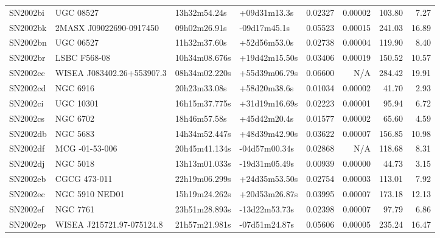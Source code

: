 \begin{longtable}{llllrrrr}
SN2002bi         &                       UGC 08527 &    13h32m54.24s &    +09d31m13.3s &  0.02327 &  0.00002 &   103.80 &        7.27 \\
SN2002bk         &         2MASX J09022690-0917450 &    09h02m26.91s &    -09d17m45.1s &  0.05523 &  0.00015 &   241.03 &       16.89 \\
SN2002bn         &                       UGC 06527 &    11h32m37.60s &    +52d56m53.0s &  0.02738 &  0.00004 &   119.90 &        8.40 \\
SN2002br         &                    LSBC F568-08 &   10h34m08.676s &   +19d42m15.50s &  0.03406 &  0.00019 &   150.52 &       10.57 \\
SN2002cc         &       WISEA J083402.26+553907.3 &   08h34m02.220s &   +55d39m06.79s &  0.06600 &      N/A &   284.42 &       19.91 \\
SN2002cd         &                        NGC 6916 &    20h23m33.08s &    +58d20m38.6s &  0.01034 &  0.00002 &    41.70 &        2.93 \\
SN2002ci         &                       UGC 10301 &   16h15m37.775s &   +31d19m16.69s &  0.02223 &  0.00001 &    95.94 &        6.72 \\
SN2002cs         &                        NGC 6702 &    18h46m57.58s &    +45d42m20.4s &  0.01577 &  0.00002 &    65.60 &        4.59 \\
SN2002db         &                        NGC 5683 &   14h34m52.447s &   +48d39m42.90s &  0.03622 &  0.00007 &   156.85 &       10.98 \\
SN2002df         &                  MCG -01-53-006 &   20h45m41.134s &   -04d57m00.34s &  0.02868 &      N/A &   118.68 &        8.31 \\
SN2002dj         &                        NGC 5018 &   13h13m01.033s &   -19d31m05.49s &  0.00939 &  0.00000 &    44.73 &        3.15 \\
SN2002eb         &                    CGCG 473-011 &   22h19m06.299s &   +24d35m53.50s &  0.02754 &  0.00003 &   113.01 &        7.92 \\
SN2002ec         &                  NGC 5910 NED01 &   15h19m24.262s &   +20d53m26.87s &  0.03995 &  0.00007 &   173.18 &       12.13 \\
SN2002ef         &                        NGC 7761 &   23h51m28.893s &   -13d22m53.73s &  0.02398 &  0.00007 &    97.79 &        6.86 \\
SN2002ep         &       WISEA J215721.97-075124.8 &   21h57m21.981s &   -07d51m24.87s &  0.05606 &  0.00005 &   235.24 &       16.47 \\

\end{longtable}
